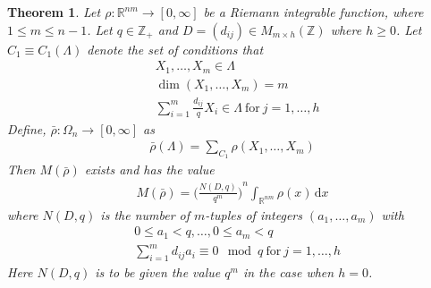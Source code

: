 \documentclass[11pt]{article}
\newtheorem{theorem}{Theorem}[section]
\theoremstyle{definition}
\theoremstyle{proof}
\begin{document}
\begin{theorem}\label{thmi}
    Let $\rho : \mathbb{R}^{nm} \to [0, \infty]$ be a Riemann integrable function, where $1 \leq  m \leq n-1$.
    Let $q \in \mathbb{Z}_+$ and $D = (d_{ij}) \in M_{m \times h} (\mathbb{Z})$ where $h \geq 0$.
    Let $C_1 \equiv C_1(\Lambda )$ denote the set of conditions that
    \begin{equation}
        \begin{split}\label{C1}
            & X_1, \ldots, X_m \in \Lambda \\
            & \dim (X_1, \ldots, X_m) = m \\
            & \sum_{i=1}^{m} \frac{d_{ij}}{q}X_i \in \Lambda \ \text{for} \ j=1, \ldots, h
        \end{split}    
    \end{equation}
    Define, $\bar{\rho } : {\Omega}_n \to [0, \infty]$ as
    \begin{equation}\label{rierhobar}
        \begin{split}
            \bar{\rho } (\Lambda ) = \sum_{C_1} \rho (X_1, \ldots,X_m)
        \end{split}
    \end{equation}
    Then $M(\bar{\rho })$ exists and has the value
    \begin{align}
        M(\bar{\rho }) = {\bigg(\frac{N(D,q)}{q^m}\bigg)}^n \int_{\mathbb{R}^{nm}} \rho (x) \,  \mathrm{d} x
    \end{align}
    where $N(D, q)$ is the number of $m$-tuples of integers $(a_1, \ldots, a_m)$ with
    \begin{align*}
        & 0 \leq a_1 < q, \ldots, 0 \leq  a_m < q \\
        & \sum_{i=1}^{m} d_{ij} a_i \equiv 0 \mod q \ \text{for} \ j=1, \ldots, h
    \end{align*}
    Here $N(D, q)$  is to be given the value $q^m$ in the case when $h = 0$.
\end{theorem}
\end{document}
